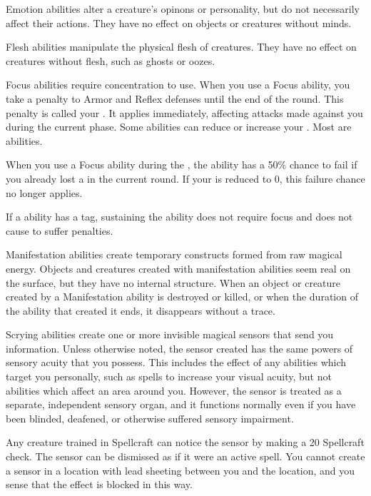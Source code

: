          Emotion abilities alter a creature's opinons or personality, but do not necessarily affect their actions.
        They have no effect on objects or creatures without minds.

         Flesh abilities manipulate the physical flesh of creatures.
        They have no effect on creatures without flesh, such as ghosts or oozes.

        \label{Focus} Focus abilities require concentration to use.
        When you use a Focus ability, you take a  penalty to Armor and Reflex defenses until the end of the round.
        This penalty is called your .
        It applies immediately, affecting attacks made against you during the current phase.
        Some abilities can reduce or increase your .
        Most  are  abilities.

        When you use a Focus ability during the , the ability has a 50\% chance to fail if you already lost a  in the current round.
        If your  is reduced to 0, this failure chance no longer applies.

        If a  ability has a  tag, sustaining the ability does not require focus and does not cause to suffer penalties.

         Manifestation abilities create temporary constructs formed from raw magical energy.
        Objects and creatures created with manifestation abilities seem real on the surface, but they have no internal structure.
        When an object or creature created by a Manifestation ability is destroyed or killed, or when the duration of the ability that created it ends, it disappears without a trace.

         Scrying abilities create one or more invisible magical sensors that send you information.
        Unless otherwise noted, the sensor created has the same powers of sensory acuity that you possess.
        This includes the effect of any abilities which target you personally, such as spells to increase your visual acuity, but not abilities which affect an area around you.
        However, the sensor is treated as a separate, independent sensory organ, and it functions normally even if you have been blinded, deafened, or otherwise suffered sensory impairment.
        \par Any creature trained in Spellcraft can notice the sensor by making a  20 Spellcraft check.
        The sensor can be dismissed as if it were an active spell.
        You cannot create a sensor in a location with lead sheeting between you and the location, and you sense that the effect is blocked in this way.
        \\

